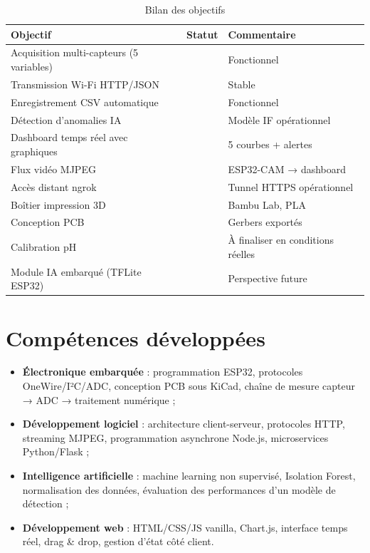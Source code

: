\documentclass[12pt,a4paper]{report}
\newcommand{\cmark}{\textcolor{accent}{\ding{51}}}
\newcommand{\xmark}{\textcolor{danger}{\ding{55}}}
\begin{document}
\begin{table}[H]
\centering
\caption{Bilan des objectifs}
\label{tab:bilan}
\begin{tabularx}{\textwidth}{@{}L{8cm}C{2cm}L{3.5cm}@{}}
\toprule
\textbf{Objectif} & \textbf{Statut} & \textbf{Commentaire} \\
\midrule
Acquisition multi-capteurs (5 variables) & \cmark & Fonctionnel \\
Transmission Wi-Fi HTTP/JSON             & \cmark & Stable \\
Enregistrement CSV automatique           & \cmark & Fonctionnel \\
Détection d'anomalies IA                 & \cmark & Modèle IF opérationnel \\
Dashboard temps réel avec graphiques     & \cmark & 5 courbes + alertes \\
Flux vidéo MJPEG                         & \cmark & ESP32-CAM → dashboard \\
Accès distant ngrok                      & \cmark & Tunnel HTTPS opérationnel \\
Boîtier impression 3D                    & \cmark & Bambu Lab, PLA \\
Conception PCB                           & \cmark & Gerbers exportés \\
Calibration pH                           & \xmark & À finaliser en conditions réelles \\
Module IA embarqué (TFLite ESP32)        & \xmark & Perspective future \\
\bottomrule
\end{tabularx}
\end{table}

\section{Compétences développées}

\begin{itemize}
  \item \textbf{Électronique embarquée} : programmation ESP32, protocoles OneWire/I²C/ADC,
        conception PCB sous KiCad, chaîne de mesure capteur → ADC → traitement numérique ;
  \item \textbf{Développement logiciel} : architecture client-serveur, protocoles HTTP,
        streaming MJPEG, programmation asynchrone Node.js, microservices Python/Flask ;
  \item \textbf{Intelligence artificielle} : machine learning non supervisé, Isolation Forest,
        normalisation des données, évaluation des performances d'un modèle de détection ;
  \item \textbf{Développement web} : HTML/CSS/JS vanilla, Chart.js, interface temps réel,
        drag \& drop, gestion d'état côté client.
\end{itemize}
\end{document}
